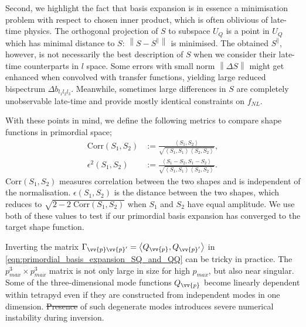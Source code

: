 \documentclass[a4paper,12pt,times,custombib,print,index]{Classes/PhDThesisPSnPDF} %
\providecommand{\DIFadd}[1]{{\protect\color{blue}\uwave{#1}}} %
\providecommand{\DIFdel}[1]{{\protect\color{red}\sout{#1}}}                      %
\providecommand{\DIFaddbegin}{} %
\providecommand{\DIFaddend}{} %
\providecommand{\DIFdelbegin}{} %
\providecommand{\DIFdelend}{} %
\newcommand{\DIFscaledelfig}{0.5}
\newlength{\DIFdelgraphicswidth} %
\newlength{\DIFdelgraphicsheight} %
\newcommand{\DIFaddincludegraphics}[2][]{{\color{blue}\fbox{\DIFOincludegraphics[#1]{#2}}}} %
\newcommand{\DIFdelincludegraphics}[2][]{%
\sbox{\DIFdelgraphicsbox}{\DIFOincludegraphics[#1]{#2}}%
\settoboxwidth{\DIFdelgraphicswidth}{\DIFdelgraphicsbox} %
\settoboxtotalheight{\DIFdelgraphicsheight}{\DIFdelgraphicsbox} %
\scalebox{\DIFscaledelfig}{%
\parbox[b]{\DIFdelgraphicswidth}{\usebox{\DIFdelgraphicsbox}\\[-\baselineskip] \rule{\DIFdelgraphicswidth}{0em}}\llap{\resizebox{\DIFdelgraphicswidth}{\DIFdelgraphicsheight}{%
\setlength{\unitlength}{\DIFdelgraphicswidth}%
\begin{picture}(1,1)%
\thicklines\linethickness{2pt} %
{\color[rgb]{1,0,0}\put(0,0){\framebox(1,1){}}}%
{\color[rgb]{1,0,0}\put(0,0){\line( 1,1){1}}}%
{\color[rgb]{1,0,0}\put(0,1){\line(1,-1){1}}}%
\end{picture}%
}\hspace*{3pt}}} %
} %
\DeclareRobustCommand{\DIFaddbegin}{\DIFOaddbegin \let\includegraphics\DIFaddincludegraphics} %
\DeclareRobustCommand{\DIFaddend}{\DIFOaddend \let\includegraphics\DIFOincludegraphics} %
\DeclareRobustCommand{\DIFdelbegin}{\DIFOdelbegin \let\includegraphics\DIFdelincludegraphics} %
\DeclareRobustCommand{\DIFdelend}{\DIFOaddend \let\includegraphics\DIFOincludegraphics} %
\begin{document}
Second, we highlight the fact that basis expansion is in essence a minimisation problem with respect to \DIFaddbegin \DIFadd{the }\DIFaddend chosen inner product, which is often oblivious of late-time physics. The orthogonal projection of $S$ to subspace $U_Q$ is a point in $U_Q$ which has \DIFaddbegin \DIFadd{the }\DIFaddend minimal distance to $S$: $\left\| S - S^\parallel \right\|$ is minimised. The obtained $S^\parallel$, however, is not necessarily the best description of $S$ when we consider their late-time counterparts in $l$ space. Some errors with small norm $\left\| \Delta S \right\|$ might get enhanced when convolved with transfer functions, yielding large reduced bispectrum $\Delta b_{l_1 l_2 l_3}$. Meanwhile, sometimes large differences in $S$ are completely unobservable late-time and provide mostly identical constraints on \DIFdelbegin \DIFdel{$f_{NL}$}\DIFdelend \DIFaddbegin \DIFadd{$f_\text{NL}$}\DIFaddend .

With these points in mind, we define the following metrics to compare shape functions in primordial space;
\begin{align}
	\text{Corr}(S_1, S_2) &:= \frac{\left< S_1, S_2 \right>}{ \sqrt{ \left< S_1, S_1 \right> \left< S_2, S_2 \right> } }, \\
	\epsilon^2(S_1, S_2) &:= \frac{\left< S_1 - S_2, S_1 - S_2 \right> }{\sqrt{\left< S_1, S_1 \right> \left< S_2, S_2 \right>}}. \label{def:primordial_shape_epsilon}
\end{align}
Corr$(S_1,S_2)$ measures correlation between the two shapes and is independent of the normalisation. $\epsilon(S_1,S_2)$ is the distance between the two shapes, which reduces to $\sqrt{2 - 2\;\text{Corr}(S_1,S_2)}$ when $S_1$ and $S_2$ have equal amplitude. We use both of these values to test if our primordial basis expansion has converged to the target shape function. 

Inverting the matrix $\Gamma_{\vv{p} \vv{p}'} = \left< Q_\vv{p}, Q_{\vv{p}'} \right>$ in \eqref{eqn:primordial_basis_expansion_SQ_and_QQ} can be tricky in practice. The \DIFdelbegin \DIFdel{$p_{max}^3 \times p_{max}^3$ }\DIFdelend \DIFaddbegin \DIFadd{$p_\text{max}^3 \times p_\text{max}^3$ }\DIFaddend matrix is not only large in size for high \DIFdelbegin \DIFdel{$p_{max}$}\DIFdelend \DIFaddbegin \DIFadd{$p_\text{max}$}\DIFaddend , but also near singular. Some of the three-dimensional mode functions $Q_\vv{p}$ become linearly dependent within tetrapyd even if they are constructed from independent modes in one dimension. \DIFdelbegin \DIFdel{Presence }\DIFdelend \DIFaddbegin \DIFadd{The presence }\DIFaddend of such degenerate modes introduces severe numerical instability during inversion.
\end{document}
